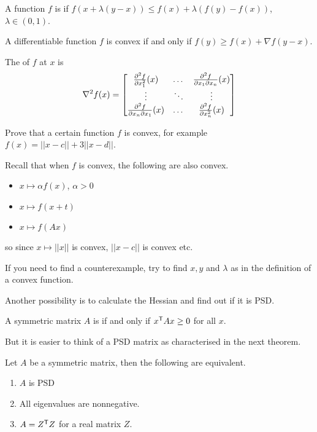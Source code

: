\documentclass{exam}
\begin{document}
    \begin{define}
        A function $f$ is  if $f(x + \lambda (y-x)) \le f(x) + \lambda ( f(y)-f(x))$, $\lambda \in (0,1)$.
    \end{define}
    \begin{theorem}
        A differentiable function $f$ is convex if and only if $f(y) \ge f(x) + \nabla f(y-x)$.
    \end{theorem}
    \begin{define}
        The  of $f$ at $x$ is
        \[
            \nabla^2 f(x) = \matrix{
            \frac{\partial^2 f}{\partial x_1^2} (x) & \dots & \frac{\partial^2 f}{\partial x_1 \partial x_n} (x) \\
            \vdots &\ddots &\vdots \\
            \frac{\partial^2 f}{\partial x_n \partial x_1} (x)  & \dots & \frac{\partial^2 f}{\partial x_n^2} (x) }
        \]
    \end{define}
    \begin{question}
        Prove that a certain function $f$ is convex, for example $f(x) = ||x-c||+3||x-d||$.
    \end{question}
    \begin{answer}
        Recall that when $f$ is convex, the following are also convex.
        \begin{itemize}
            \item $x \mapsto \alpha f(x)$, $\alpha >0$
            \item $x \mapsto f(x+t)$
            \item $x \mapsto f(Ax)$
        \end{itemize}
        so since $x \mapsto ||x||$ is convex, $||x-c||$ is convex etc.

        If you need to find a counterexample, try to find $x,y$ and $\lambda$ as in the definition of a convex function.
    \end{answer}
    \begin{answer}
        Another possibility is to calculate the Hessian and find out if it is PSD.
    \end{answer}
    \begin{define}
        A symmetric matrix $A$ is  if and only if $x^{\mathsf{T}} A x \ge 0$ for all $x$.
    \end{define}
    But it is easier to think of a PSD matrix as characterised in the next theorem.
    \begin{theorem}
        Let $A$ be a symmetric matrix, then the following are equivalent.
        \begin{enumerate}
            \item $A$ is PSD
            \item All eigenvalues are nonnegative.
            \item $A=Z^{\mathsf{T}} Z$ for a real matrix $Z$.
        \end{enumerate}
    \end{theorem}
\end{document}
